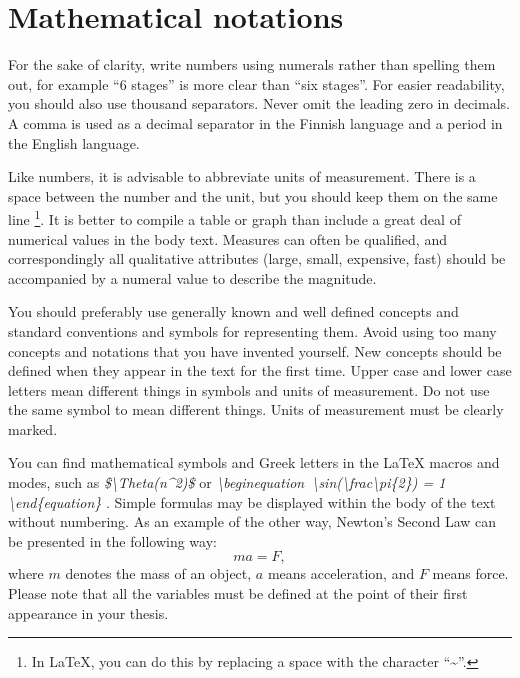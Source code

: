\documentclass[twoside,draftfooter]{tutthesis} %
\begin{document}
\section{Mathematical notations}

For the sake of clarity, write numbers using numerals rather than spelling them out, for example ``6 stages'' is more clear than ``six stages''.
For easier readability, you should also use thousand separators.
Never omit the leading zero in decimals.
A comma is used as a decimal separator in the Finnish language and a period in the English language.

Like numbers, it is advisable to abbreviate units of measurement.
There is a space between the number and the unit, but you should keep them on the same line \footnote{In LaTeX, you can do this by replacing a space with the character ``\textasciitilde''.}.
It is better to compile a table or graph than include a great deal of numerical values in the body text.
Measures can often be qualified, and correspondingly all qualitative attributes (large, small, expensive, fast) should be accompanied by a numeral value to describe the magnitude.



You should preferably use generally known and well defined concepts and standard conventions and symbols for representing them.
Avoid using too many concepts and notations that you have invented yourself.
New concepts should be defined when they appear in the text for the first time.
Upper case and lower case letters mean different things in symbols and units of measurement.
Do not use the same symbol to mean different things.
Units of measurement must be clearly marked.

You can find mathematical symbols and Greek letters in the LaTeX macros and modes, such as
\emph{\$\textbackslash Theta(n\textasciicircum2)\$}
or
\emph{\textbackslash begin\textbraceleft equation\textbraceright\ \textbackslash sin(\textbackslash frac\textbraceleft \textbackslash pi\textbraceright\{2\}) = 1 \textbackslash end\{equation\}}
.
Simple formulas may be displayed within the body of the text without numbering.
As an example of the other way, Newton's Second Law can be presented in the following way:
\begin{equation} %
\label{eq:Newton2} ma = F,
\end{equation} %
where $m$ denotes the mass of an object, $a$ means acceleration, and $F$ means force.
Please note that all the variables must be defined at the point of their first appearance in your thesis.
\end{document}
